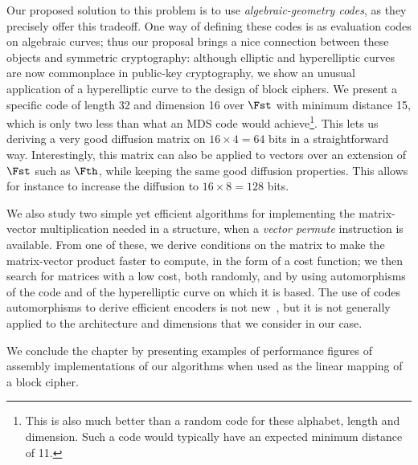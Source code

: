 Our proposed solution to this problem is to use \emph{algebraic-geometry codes}, as they precisely offer this tradeoff.
One way of defining these codes is as evaluation codes on algebraic curves; thus our proposal brings a nice connection between these objects and
symmetric cryptography: although elliptic and hyperelliptic curves are now commonplace in public-key cryptography, we show an unusual application of
a hyperelliptic curve to the design of block ciphers. We present a specific code of length 32 and dimension 16 over $\Fst$ with minimum distance 15, which is only
two less than what an MDS code would achieve\footnote{This is also much better than a random code for these alphabet, length and dimension. Such a code
would typically have an expected minimum distance of 11.}.
This lets us deriving a very good diffusion matrix on $16\times4 = 64$ bits in a straightforward way. Interestingly, this matrix can also be applied
to vectors over an extension of $\Fst$ such as $\Fth$, while keeping the same good diffusion properties.
This allows for instance to increase the diffusion to $16\times8 = 128$ bits.

We also study two simple yet efficient algorithms for implementing the matrix-vector multiplication needed in a \shark{}
structure, when a \emph{vector permute} instruction is available. From one of these, we derive conditions on the matrix to make the matrix-vector product
faster to compute, in the form of a cost function; we then search for matrices with a low cost, both randomly, and by using automorphisms of the code and of the hyperelliptic
curve on which it is based. The use of codes automorphisms to derive efficient encoders is not new~\cite{sysgrob,grobarch},
but it is not generally applied to the architecture and dimensions that we consider in our case.

We conclude the chapter by presenting examples of performance figures of assembly implementations of our algorithms when used as the linear mapping of
a block cipher.
